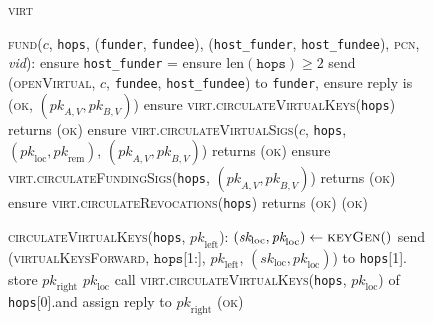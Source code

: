 \begin{figure}[H]
  \begin{processbox}{\textsc{virt}}
    \begin{algorithmic}[1]
      \State \textsc{fund}($c$, \texttt{hops}, (\texttt{funder},
      \texttt{fundee}), (\texttt{host\_funder}, \texttt{host\_fundee}),
      \textsc{pcn}, \textit{vid}):
      \Indent
        \State ensure \texttt{host\_funder} = \alice{} 
        \State ensure $\mathrm{len}(\texttt{hops}) \geq 2$ 
        \State send (\textsc{openVirtual}, $c$, \texttt{fundee},
        \texttt{host\_fundee}) to \texttt{funder}, ensure reply is (\textsc{ok},
        $(\textit{pk}_{A, V}, \textit{pk}_{B, V})$)
        \State ensure \textsc{virt.circulateVirtualKeys}(\texttt{hops}) returns
        (\textsc{ok})
        \State ensure \textsc{virt.circulateVirtualSigs}($c$, \texttt{hops},
        $(\textit{pk}_{\mathrm{loc}}, \textit{pk}_{\mathrm{rem}})$,
        $(\textit{pk}_{A, V}, \textit{pk}_{B, V})$) returns (\textsc{ok})
        \State ensure \textsc{virt.circulateFundingSigs}(\texttt{hops},
        $(\textit{pk}_{A, V}, \textit{pk}_{B, V})$) returns (\textsc{ok})
        \State ensure \textsc{virt.circulateRevocations}(\texttt{hops}) returns
        (\textsc{ok})
        \State \Return (\textsc{ok})
      \EndIndent
      \Statex

      \State \textsc{circulateVirtualKeys}(\texttt{hops},
      $\textit{pk}_{\mathrm{left}}$):
      \Indent
        \State {}
        \State $(\textit{sk}_{\mathrm{loc}}, \textit{pk}_{\mathrm{loc}}) \gets
        \textsc{keyGen}()$
         
           
            \State send (\textsc{virtualKeysForward}, $\texttt{hops}$[1:],
            $\textit{pk}_{\mathrm{left}}$, $(\textit{sk}_{\mathrm{loc}},
            \textit{pk}_{\mathrm{loc}})$) to \texttt{hops}[1].\alice{}
            \State {}
            \State {}
            \State {}
            \State store $\textit{pk}_{\mathrm{right}}$
          \EndIf
          \State \Return $\textit{pk}_{\mathrm{loc}}$
        \Else \: 
          \State call \textsc{virt.circulateVirtualKeys}(\texttt{hops},
          $\textit{pk}_{\mathrm{loc}}$) of \texttt{hops}[0].\bob and assign
          reply to $\textit{pk}_{\mathrm{right}}$
          \State \Return (\textsc{ok})
        \EndIf
      \EndIndent
      \Statex


\end{algorithmic}
\end{processbox}
\end{figure}
